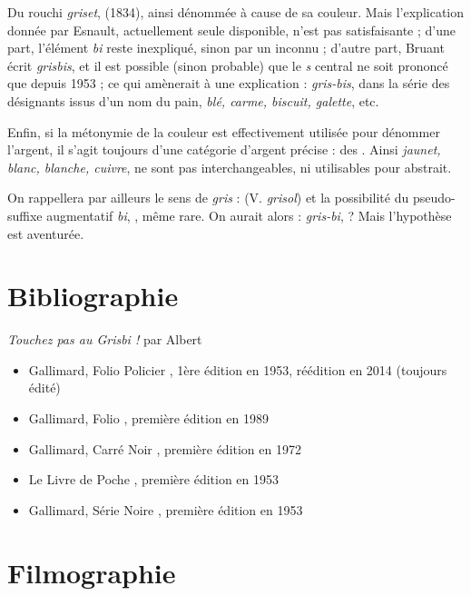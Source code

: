 {Du rouchi \emph{griset},  (1834), ainsi dénommée à cause de sa couleur. Mais l'explication donnée par Esnault, actuellement seule 
disponible, n'est pas satisfaisante ; d'une part, l'élément \emph{bi} reste
inexpliqué, sinon par un  inconnu ; d'autre part, Bruant écrit
\emph{grisbis}, et il est possible (sinon probable) que le \emph{s} central ne
soit prononcé que depuis 1953 ; ce qui amènerait à une explication :
\emph{gris-bis}, dans la série des désignants issus d'un nom du pain,
\emph{blé, carme, biscuit, galette}, etc.

Enfin, si la métonymie de la couleur est effectivement utilisée pour dénommer
l'argent, il s'agit toujours d'une catégorie d'argent précise : des .
Ainsi \emph{jaunet, blanc, blanche, cuivre}, ne sont pas interchangeables, ni 
utilisables pour  abstrait.

On rappellera par ailleurs le sens de \emph{gris} :  (V. \emph{grisol}) et la possibilité du pseudo-suffixe augmentatif \emph{bi}, , même rare. On aurait alors : \emph{gris-bi},  ? Mais l'hypothèse est aventurée.


\section{Bibliographie\label{preamble-biblio}}


\emph{Touchez pas au Grisbi !} par Albert 

\begin{itemize}
	\item Gallimard, Folio Policier , 1ère édition en 1953, réédition en 2014 (toujours édité)
	\item Gallimard, Folio , première édition en 1989
	\item Gallimard, Carré Noir , première édition en 1972
	\item Le Livre de Poche , première édition en 1953
	\item Gallimard, Série Noire , première édition en 1953
\end{itemize}


\section{Filmographie\label{preamble-filmography}}



}
